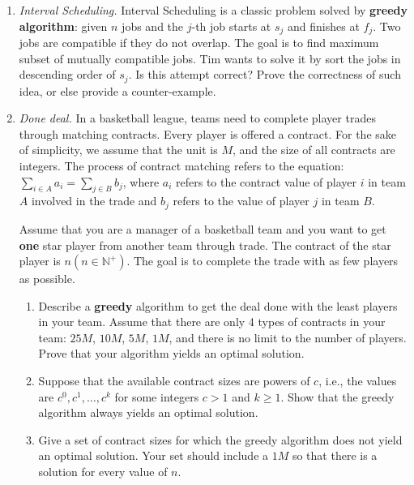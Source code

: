 \documentclass[12pt,a4paper]{article}
\makeatletter
\newtheorem*{solution}{Solution}
\theoremstyle{definition}
\renewenvironment{solution}[1][Solution] {\par\pushQED{\qed}\normalfont\topsep6\p@\@plus6\p@\relax\trivlist\item[\hskip\labelsep\bfseries#1\@addpunct{.}]\ignorespaces}{\popQED\endtrivlist\@endpefalse} \makeatother
\makeatother
\begin{document}
\begin{enumerate}
	\item \textit{Interval Scheduling.} Interval Scheduling is a classic problem solved by \textbf{greedy algorithm}: given $n$ jobs and the $j$-th job starts at $s_j$ and finishes at $f_j$. Two jobs are compatible if they do not overlap. The goal is to find maximum subset of mutually compatible jobs. Tim wants to solve it by sort the jobs in descending order of $s_j$. Is this attempt correct? Prove the correctness of such idea, or else provide a counter-example.
	
	\item \textit{Done deal.} In a basketball league, teams need to complete player trades through matching contracts. Every player is offered a contract. For the sake of simplicity, we assume that the unit is $ M $, and the size of all contracts are integers. The process of contract matching refers to the equation: $ \sum_{i\in A} a_{i}=\sum_{j\in B} b_{j} $, where $ a_{i} $ refers to the contract value of player $ i $ in team $A$ involved in the trade and $ b_{j} $ refers to the value of player $ j $ in team $B$. 
	
	Assume that you are a manager of a basketball team and you want to get \textbf{one} star player from another team through trade. The contract of the star player is $ n (n\in \mathbb{N}^+) $. The goal is to complete the trade with as few players as possible. 
	
	\begin{enumerate}
		\item Describe a \textbf{greedy} algorithm to get the deal done with the least players in your team. Assume that there are only 4 types of contracts in your team: $25M$, $ 10M $, $ 5M $, $ 1M $, and there is no limit to the number of players. Prove that your algorithm yields an optimal solution.
		\item Suppose that the available contract sizes are powers of $c$,
		i.e., the values are $c^{0}, c^{1}, \ldots, c^{k}$ for some integers $c>1$ and $k \geq 1$. Show that the greedy algorithm always yields an optimal solution.
		\item Give a set of contract sizes for which the greedy algorithm does not yield an optimal solution. Your set should include a $ 1M $ so that there is a solution for every value of $ n $.
	\end{enumerate}
	

\end{enumerate}
\end{document}

